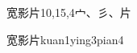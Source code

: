 \begin{entry}{宽影片}{10,15,4}{⼧、⼺、⽚}
  \begin{phonetics}{宽影片}{kuan1ying3pian4}
  \end{phonetics}
\end{entry}
